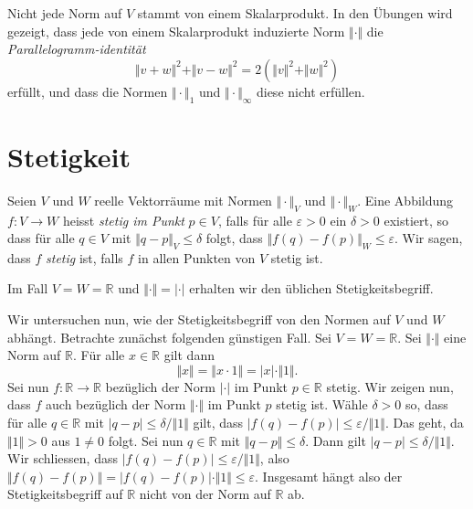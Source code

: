 \documentclass[../main.tex]{subfiles}
\begin{document}
\begin{remark}
  Nicht jede Norm auf $V$ stammt von einem Skalarprodukt.
  In den Übungen wird gezeigt, dass jede von einem Skalarprodukt
  induzierte Norm $\Vert \cdot \Vert$ die
  \emph{Parallelogramm-identität}
  \[
    \Vert v + w \Vert^2 + \Vert v - w \Vert^2 
    = 2(\Vert v \Vert^2 + \Vert w \Vert^2)
  \]
  erfüllt, und dass die Normen $\Vert \cdot \Vert_1$ 
  und $\Vert \cdot \Vert_{\infty}$ diese nicht erfüllen.
\end{remark}

\section{Stetigkeit}\label{sec:continuity}
\begin{definition}
  Seien $V$ und $W$ reelle Vektorräume mit Normen $\Vert \cdot \Vert_V$ 
  und
  $ \Vert \cdot \Vert_W$.
  Eine Abbildung $f \colon V \to W$ heisst \emph{stetig
  im Punkt} $p \in V$, falls für alle $\varepsilon > 0$ 
  ein $\delta > 0$ existiert, so dass für alle
  $q \in V$ mit $\Vert q - p \Vert_V \leq \delta$ 
  folgt, dass
  $\Vert f(q) - f(p) \Vert_W \leq \varepsilon$.
  Wir sagen, dass $f$ \emph{stetig} ist, falls
  $f$ in allen Punkten von $V$ stetig ist.
\end{definition}

\begin{example}
  Im Fall $V = W = \mathbb{R}$ und $\Vert \cdot \Vert = \vert \cdot \vert$ 
  erhalten wir den üblichen Stetigkeitsbegriff.
\end{example}

Wir untersuchen nun,
wie der Stetigkeitsbegriff von den Normen
auf  $V$ und $W$ abhängt.
Betrachte zunächst folgenden günstigen Fall.
Sei $V = W = \mathbb{R}$. Sei $\Vert \cdot \Vert$ 
eine Norm auf $\mathbb{R}$.
Für alle $x \in \mathbb{R}$ gilt dann
\[
  \Vert x \Vert = \Vert x \cdot 1 \Vert = |x| \cdot \Vert 1 \Vert.
\]
Sei nun $f \colon \mathbb{R} \to \mathbb{R}$
bezüglich der Norm $| \cdot |$ im Punkt $p \in \mathbb{R}$ stetig.
Wir zeigen nun, dass $f$ auch bezüglich der Norm $\Vert \cdot \Vert$ 
im Punkt $p$ stetig ist.
Wähle $\delta > 0$ so, dass für alle $q \in \mathbb{R}$ 
mit $|q - p| \leq \delta/\Vert 1 \Vert$ gilt,
dass $|f(q) - f(p)| \leq \varepsilon/\Vert 1 \Vert$.
Das geht, da $\Vert 1 \Vert > 0$ aus $1 \neq 0$ folgt.
Sei nun $q \in \mathbb{R}$ mit $\Vert q - p \Vert \leq \delta$.
Dann gilt $|q - p| \leq \delta / \Vert 1 \Vert$.
Wir schliessen, dass $|f(q) - f(p)| \leq \varepsilon/\Vert 1 \Vert$,
also 
$\Vert f(q) - f(p) \Vert = |f(q) - f(p)| \cdot \Vert 1 \Vert \leq \varepsilon$.
Insgesamt hängt also der Stetigkeitsbegriff auf $\mathbb{R}$ nicht von
der Norm auf $\mathbb{R}$ ab.
\end{document}
